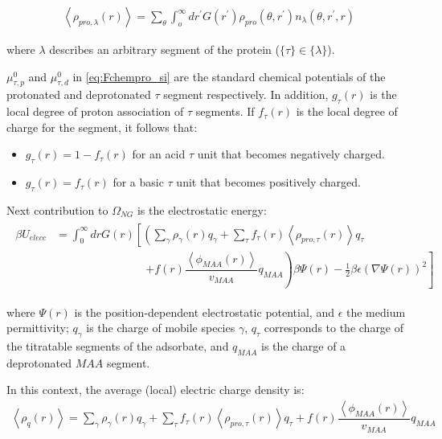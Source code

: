 \documentclass[journal=jacsat,manuscript=suppinfo]{achemso}
\begin{document}
\begin{align}
	\left<\rho_{pro,\lambda}(r)\right> = \sum_\theta \int_o^\infty dr^\prime G(r^\prime) \rho_{pro}(\theta,r^\prime)n_\lambda(\theta,r^\prime,r)
\end{align}

\noindent where $\lambda$ describes an arbitrary segment of the protein ($\{\tau\}\in\{\lambda\}$).



$\mu^0_{\tau,p}$ and $\mu^0_{\tau,d}$ in \cref{eq:Fchempro_si} are the standard chemical potentials of the protonated and deprotonated $\tau$ segment respectively.
In addition, $g_\tau(r)$ is the local degree of proton association of $\tau$ segments.
If $f_\tau(r)$ is the local degree of charge for the segment, it follows that: 
\begin{itemize}
	\item $g_\tau(r) = 1-f_\tau(r)$ for an acid $\tau$ unit that becomes negatively charged.
	\item  $g_\tau(r) = f_\tau(r)$ for a basic $\tau$ unit that becomes positively charged.
\end{itemize}


Next contribution to $\Omega_{NG}$ is the electrostatic  energy:
\begin{align}
	\begin{aligned}
		\beta U_{elecc}& = \int_0^\infty drG(r)\left[\left(\sum_{\gamma } \rho_\gamma(r) q_\gamma + \sum_\tau{f_\tau(r) \left<\rho_{pro,\tau}(r)\right> q_\tau}  \right. \right.\\ &\hspace{8em} \left. \left. + f(r)\dfrac{\left<\phi_{MAA}(r)\right>}{v_{MAA}}q_{MAA}\right)\beta\Psi(r) -\frac{1}{2}\beta\epsilon(\nabla\Psi(r))^2 \right]
	\end{aligned}
\end{align} 

\noindent where $\Psi(r)$ is the position-dependent electrostatic potential, and $\epsilon$ the medium permittivity; 
$q_\gamma$ is the charge of  mobile species $\gamma$, $q_\tau$ corresponds to the charge of the titratable segments of the adsorbate, and  $q_{MAA}$ is the charge of a deprotonated $MAA$ segment.

In this context, the average (local) electric charge density is:
\begin{align}
	\left<\rho_q(r)\right> = \sum_{\gamma } {\rho_\gamma(r) q_\gamma + \sum_\tau{f_\tau(r) \left<\rho_{pro,\tau}(r)\right> q_\tau} +  f(r)\dfrac{\left<\phi_{MAA}(r)\right>}{v_{MAA}}q_{MAA}}
	\label{si:eq:rho_charge}
\end{align}
\end{document}
